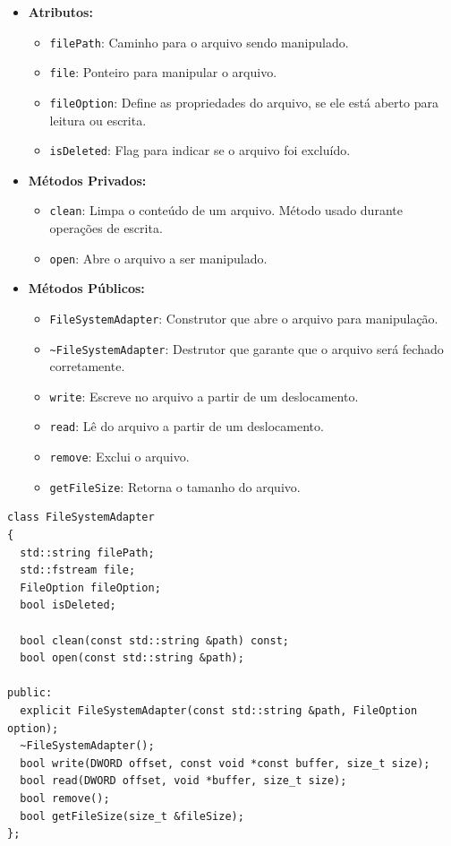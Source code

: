 \documentclass[
    12pt,				%
    oneside,   	        %
    a4paper,			%
    english,			%
    french,				%
    spanish,			%
    brazil,				%
    ]{pacotes/abntex2}
\begin{document}
\begin{itemize}
    \item \textbf{Atributos:}
        \begin{itemize}
            \item \texttt{filePath}: Caminho para o arquivo sendo manipulado.
            \item \texttt{file}: Ponteiro para manipular o arquivo.
            \item \texttt{fileOption}: Define as propriedades do arquivo, se ele está aberto para leitura ou escrita.
            \item \texttt{isDeleted}: Flag para indicar se o arquivo foi excluído.
        \end{itemize}
    \item \textbf{M\'etodos Privados:}
        \begin{itemize}
            \item \texttt{clean}: Limpa o conteúdo de um arquivo. Método usado durante operações de escrita.
            
            \item \texttt{open}: Abre o arquivo a ser manipulado.
        \end{itemize}
    \item \textbf{Métodos Públicos:}
        \begin{itemize}
            \item \texttt{FileSystemAdapter}: Construtor que abre o arquivo para manipulação.

            \item \texttt{\textasciitilde FileSystemAdapter}: Destrutor que garante que o arquivo será fechado corretamente.
            
            \item \texttt{write}: Escreve no arquivo a partir de um deslocamento.
            \item \texttt{read}: Lê do arquivo a partir de um deslocamento.
            \item \texttt{remove}: Exclui o arquivo.
            \item \texttt{getFileSize}: Retorna o tamanho do arquivo.
        \end{itemize}
\end{itemize}

\begin{lstlisting}[caption={Classe para manipulação de arquivos no sistema}, label={lst:filesystemadapter}]
class FileSystemAdapter
{
  std::string filePath;
  std::fstream file;
  FileOption fileOption;
  bool isDeleted;

  bool clean(const std::string &path) const;
  bool open(const std::string &path);

public:
  explicit FileSystemAdapter(const std::string &path, FileOption option);
  ~FileSystemAdapter();
  bool write(DWORD offset, const void *const buffer, size_t size);
  bool read(DWORD offset, void *buffer, size_t size);
  bool remove();
  bool getFileSize(size_t &fileSize);
};
\end{lstlisting}
\end{document}
